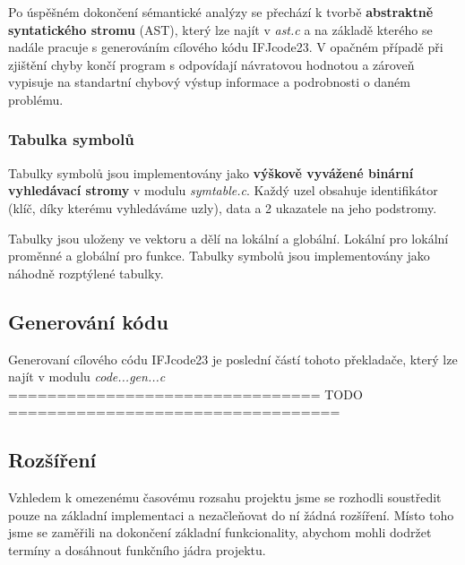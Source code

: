 \documentclass[a4paper, 12pt]{article} %
\begin{document}
            Po úspěšném dokončení sémantické 
            analýzy se přechází k tvorbě \textbf{abstraktně syntatického stromu} (AST), který lze najít v 
            \textit{ast.c} a na základě kterého se nadále pracuje s generováním cílového kódu IFJcode23. 
            V opačném případě při zjištění chyby končí program s odpovídají návratovou hodnotou a 
            zároveň vypisuje na standartní chybový výstup informace a podrobnosti o daném problému.


            \subsubsection{Tabulka symbolů}
                Tabulky symbolů jsou implementovány jako \textbf{výškově vyvážené binární vyhledávací stromy}
                v modulu \textit{symtable.c}. Každý uzel obsahuje identifikátor (klíč, díky kterému 
                vyhledáváme uzly), data a 2 ukazatele na jeho podstromy.
                
                Tabulky jsou uloženy ve vektoru a dělí na lokální a globální. Lokální pro lokální 
                proměnné a globální pro funkce. Tabulky symbolů jsou implementovány jako 
                náhodně rozptýlené tabulky.

        \subsection{Generování kódu} \label{codegen}
            Generovaní cílového códu IFJcode23 je poslední částí tohoto překladače, který lze najít 
            v modulu \textit{code...gen...c} \\
            ================================ TODO ==================================


        \subsection{Rozšíření}
            Vzhledem k omezenému časovému rozsahu projektu jsme se rozhodli soustředit pouze na 
            základní implementaci a nezačleňovat do ní žádná rozšíření. Místo toho jsme se zaměřili 
            na dokončení základní funkcionality, abychom mohli dodržet termíny a dosáhnout funkčního 
            jádra projektu.
    
\end{document}
